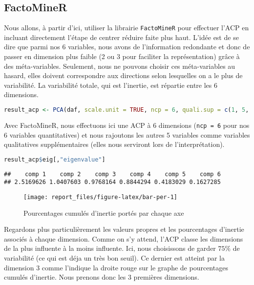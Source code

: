 \documentclass[
  11pt,
  xcolor = usenames,dvipsnames]{article}
\newcommand{\passthrough}[1]{#1}
\begin{document}
\hypertarget{factominer}{%
\subsection{FactoMineR}\label{factominer}}

Nous allons, à partir d'ici, utiliser la librairie \passthrough{\lstinline!FactoMineR!} pour effectuer l'ACP en incluant directement l'étape de centrer réduire faite plus haut.
L'idée est de se dire que parmi nos 6 variables, nous avons de l'information redondante et donc de passer en dimension plus faible
(2 ou 3 pour faciliter la représentation) grâce à des méta-variables. Seulement, nous ne pouvons choisir ces méta-variables au hasard,
elles doivent correspondre aux directions selon lesquelles on a le plus de variabilité. La variabilité totale, qui est l'inertie,
est répartie entre les 6 dimensions.

\begin{lstlisting}[language=R]
result_acp <- PCA(daf, scale.unit = TRUE, ncp = 6, quali.sup = c(1, 5, 6, 9, 11), graph = FALSE)
\end{lstlisting}

Avec FactoMineR, nous effectuons ici une ACP à 6 dimensions (\passthrough{\lstinline!ncp = 6!} pour nos 6 variables quantitatives) et
nous rajoutons les autres 5 variables comme variables qualitatives supplémentaires
(elles nous serviront lors de l'interprétation).

\begin{lstlisting}[language=R]
result_acp$eig[,"eigenvalue"]
\end{lstlisting}

\begin{lstlisting}
##    comp 1    comp 2    comp 3    comp 4    comp 5    comp 6 
## 2.5169626 1.0407603 0.9768164 0.8844294 0.4183029 0.1627285
\end{lstlisting}

\begin{figure}

{\centering \texttt{[image: report\_files/figure-latex/bar-per-1]} 

}

\caption{Pourcentages cumulés d'inertie portés par chaque axe}\label{fig:bar-per}
\end{figure}

Regardons plus particulièrement les valeurs propres et les pourcentages d'inertie associés à chaque dimension.
Comme on s'y attend, l'ACP classe les dimensions de la plus influente à la moins influente.
Ici, nous choisissons de garder \(75\%\) de variabilité (ce qui est déja un très bon seuil).
Ce dernier est atteint par la dimension 3 comme l'indique la droite rouge sur le graphe de pourcentages cumulés d'inertie.
Nous prenons donc les 3 premières dimensions.
\end{document}
